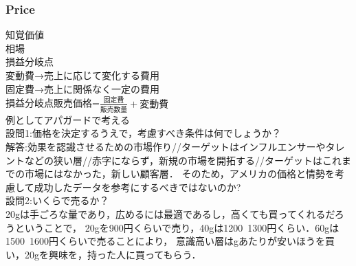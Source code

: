 \documentclass[a4paper,11pt]{ltjsarticle}
\begin{document}
\subsubsection{Price}
知覚価値\\
相場\\
損益分岐点\\
変動費→売上に応じて変化する費用\\
固定費→売上に関係なく一定の費用\\
損益分岐点販売価格=$\frac{固定費}{販売数量}+\text{変動費}$\\
例としてアパガードで考える\\
設問1:価格を決定するうえで，考慮すべき条件は何でしょうか？\\
解答:効果を認識させるための市場作り//ターゲットはインフルエンサーやタレントなどの狭い層//赤字にならず，新規の市場を開拓する//ターゲットはこれまでの市場にはなかった，新しい顧客層．
そのため，アメリカの価格と情勢を考慮して成功したデータを参考にするべきではないのか?\\
設問2:いくらで売るか？\\
20gは手ごろな量であり，広めるには最適であるし，高くても買ってくれるだろうということで，
20gを900円くらいで売り，40gは1200~1300円くらい．60gは1500~1600円くらいで売ることにより，
意識高い層はgあたりが安いほうを買い，20gを興味を，持った人に買ってもらう．
\end{document}
